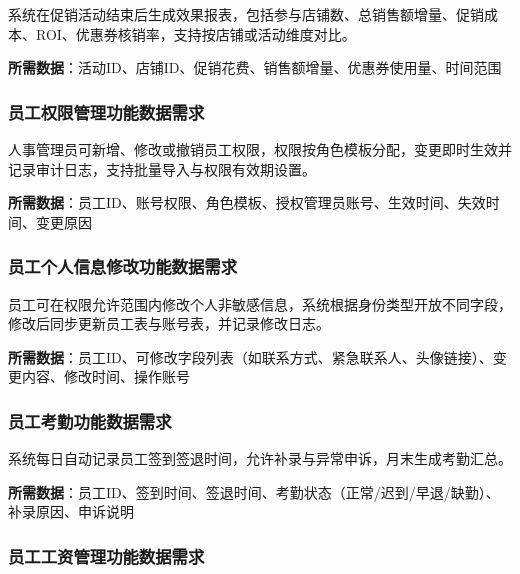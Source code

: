 \documentclass[]{article}
\begin{document}
系统在促销活动结束后生成效果报表，包括参与店铺数、总销售额增量、促销成本、ROI、优惠券核销率，支持按店铺或活动维度对比。

\textbf{所需数据}：活动ID、店铺ID、促销花费、销售额增量、优惠券使用量、时间范围

\hypertarget{ux5458ux5de5ux6743ux9650ux7ba1ux7406ux529fux80fdux6570ux636eux9700ux6c42}{%
\subsubsection{员工权限管理功能数据需求}\label{ux5458ux5de5ux6743ux9650ux7ba1ux7406ux529fux80fdux6570ux636eux9700ux6c42}}

人事管理员可新增、修改或撤销员工权限，权限按角色模板分配，变更即时生效并记录审计日志，支持批量导入与权限有效期设置。

\textbf{所需数据}：员工ID、账号权限、角色模板、授权管理员账号、生效时间、失效时间、变更原因

\hypertarget{ux5458ux5de5ux4e2aux4ebaux4fe1ux606fux4feeux6539ux529fux80fdux6570ux636eux9700ux6c42}{%
\subsubsection{员工个人信息修改功能数据需求}\label{ux5458ux5de5ux4e2aux4ebaux4fe1ux606fux4feeux6539ux529fux80fdux6570ux636eux9700ux6c42}}

员工可在权限允许范围内修改个人非敏感信息，系统根据身份类型开放不同字段，修改后同步更新员工表与账号表，并记录修改日志。

\textbf{所需数据}：员工ID、可修改字段列表（如联系方式、紧急联系人、头像链接）、变更内容、修改时间、操作账号

\hypertarget{ux5458ux5de5ux8003ux52e4ux529fux80fdux6570ux636eux9700ux6c42}{%
\subsubsection{员工考勤功能数据需求}\label{ux5458ux5de5ux8003ux52e4ux529fux80fdux6570ux636eux9700ux6c42}}

系统每日自动记录员工签到签退时间，允许补录与异常申诉，月末生成考勤汇总。

\textbf{所需数据}：员工ID、签到时间、签退时间、考勤状态（正常/迟到/早退/缺勤）、补录原因、申诉说明

\hypertarget{ux5458ux5de5ux5de5ux8d44ux7ba1ux7406ux529fux80fdux6570ux636eux9700ux6c42}{%
\subsubsection{员工工资管理功能数据需求}\label{ux5458ux5de5ux5de5ux8d44ux7ba1ux7406ux529fux80fdux6570ux636eux9700ux6c42}}
\end{document}
